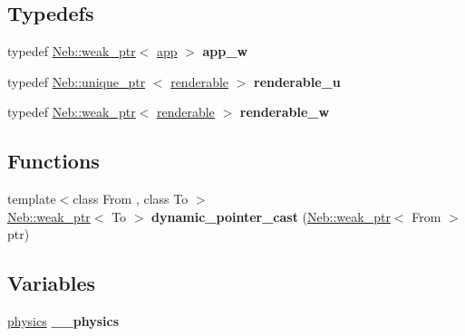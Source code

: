 \subsection*{\-Typedefs}
\begin{DoxyCompactItemize}
\item 
\hypertarget{namespaceNeb_aa4fcad20cebfd0160ee2d0285a6fc129}{typedef \hyperlink{classNeb_1_1weak__ptr}{\-Neb\-::weak\-\_\-ptr}$<$ \hyperlink{classNeb_1_1app}{app} $>$ {\bfseries app\-\_\-w}}\label{namespaceNeb_aa4fcad20cebfd0160ee2d0285a6fc129}

\item 
\hypertarget{namespaceNeb_ae8d36138d23d3c479a601c88b3393b43}{typedef \hyperlink{classNeb_1_1unique__ptr}{\-Neb\-::unique\-\_\-ptr}\*
$<$ \hyperlink{classNeb_1_1renderable}{renderable} $>$ {\bfseries renderable\-\_\-u}}\label{namespaceNeb_ae8d36138d23d3c479a601c88b3393b43}

\item 
\hypertarget{namespaceNeb_a0aac28857d44701417babbe71c47de0b}{typedef \hyperlink{classNeb_1_1weak__ptr}{\-Neb\-::weak\-\_\-ptr}$<$ \hyperlink{classNeb_1_1renderable}{renderable} $>$ {\bfseries renderable\-\_\-w}}\label{namespaceNeb_a0aac28857d44701417babbe71c47de0b}

\end{DoxyCompactItemize}
\subsection*{\-Functions}
\begin{DoxyCompactItemize}
\item 
\hypertarget{namespaceNeb_a4ed152a7fe9e22a11580d60f1d14b2d2}{{\footnotesize template$<$class From , class To $>$ }\\\hyperlink{classNeb_1_1weak__ptr}{\-Neb\-::weak\-\_\-ptr}$<$ \-To $>$ {\bfseries dynamic\-\_\-pointer\-\_\-cast} (\hyperlink{classNeb_1_1weak__ptr}{\-Neb\-::weak\-\_\-ptr}$<$ \-From $>$ ptr)}\label{namespaceNeb_a4ed152a7fe9e22a11580d60f1d14b2d2}

\end{DoxyCompactItemize}
\subsection*{\-Variables}
\begin{DoxyCompactItemize}
\item 
\hypertarget{namespaceNeb_a16bff826fe3b967c09a5f37850d60ee5}{\hyperlink{classNeb_1_1physics}{physics} {\bfseries \-\_\-\-\_\-physics}}\label{namespaceNeb_a16bff826fe3b967c09a5f37850d60ee5}

\end{DoxyCompactItemize}


